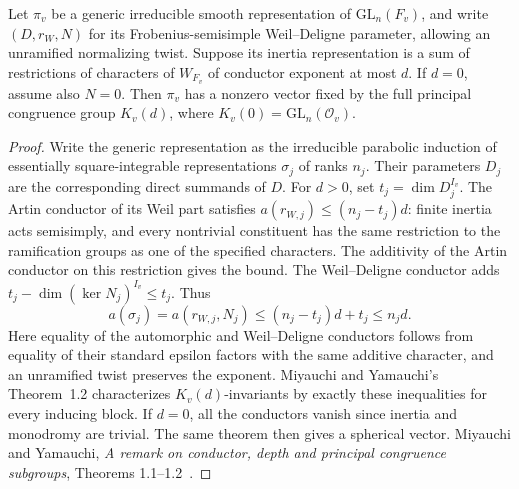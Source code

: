 \begin{lemma}
Let $\pi_v$\label{newgal:fixed} be a generic irreducible smooth representation of
$\mathrm{GL}_n(F_v)$, and write $(D,r_W,N)$ for its
Frobenius-semisimple Weil--Deligne parameter, allowing an unramified
normalizing twist. Suppose its inertia representation is a sum of
restrictions of characters of $W_{F_v}$ of conductor exponent at most
$d$. If $d=0$, assume also $N=0$. Then $\pi_v$ has a nonzero vector
fixed by the full principal congruence group $K_v(d)$, where
$K_v(0)=\mathrm{GL}_n(\mathcal O_v)$.
\end{lemma}
\begin{proof}
Write the generic representation as the irreducible parabolic induction
of essentially square-integrable representations $\sigma_j$ of ranks
$n_j$. Their parameters $D_j$ are the corresponding direct summands of
$D$. For $d>0$, set $t_j=\dim D_j^{I_v}$. The Artin conductor of its
Weil part satisfies $a(r_{W,j})\le (n_j-t_j)d$: finite inertia acts
semisimply, and every nontrivial constituent has the same restriction
to the ramification groups as one of the specified characters. The
additivity of the Artin conductor on this restriction gives the bound.
The Weil--Deligne conductor adds
$t_j-\dim(\ker N_j)^{I_v}\le t_j$. Thus
\[
 a(\sigma_j)=a(r_{W,j},N_j)\le (n_j-t_j)d+t_j\le n_jd .
\]
Here equality of the automorphic and Weil--Deligne conductors follows
from equality of their standard epsilon factors with the same additive
character, and an unramified twist preserves the exponent.
Miyauchi and Yamauchi's Theorem~1.2 characterizes $K_v(d)$-invariants
by exactly these inequalities for every inducing block. If $d=0$, all
the conductors vanish since inertia and monodromy are trivial. The
same theorem then gives a spherical vector.
Miyauchi and Yamauchi,
\emph{A remark on conductor, depth and principal congruence subgroups},
Theorems 1.1--1.2~\cite{miyauchiYamauchi}.
\end{proof}

